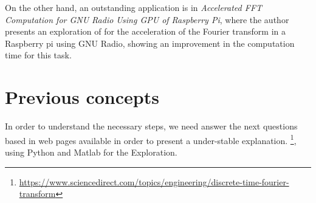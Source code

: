 \documentclass[12pt, twoside]{report}
\begin{document}
On the other hand, an outstanding application is in \cite{Sabarinath2015} \textit{Accelerated FFT Computation for GNU Radio Using GPU of Raspberry Pi}, where the author presents an exploration of for the acceleration of the Fourier transform in a Raspberry pi using GNU Radio, showing an improvement in the computation time for this task.\\
\section{Previous concepts}
In order to understand the necessary steps, we need answer the next questions based in web pages available in order to present a under-stable explanation. \footnote{\url{https://www.sciencedirect.com/topics/engineering/discrete-time-fourier-transform}}, using Python and Matlab for the Exploration.\\
\end{document}
